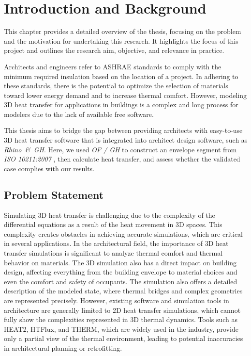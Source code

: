 \chapter{Introduction and Background}
This chapter provides a detailed overview of the thesis, focusing on the problem and the motivation for undertaking this research. It highlights the focus of this project and outlines the research aim, objective, and relevance in practice.

Architects and engineers refer to ASHRAE standards to comply with the minimum required insulation based on the location of a project. 
In adhering to these standards, there is the potential to optimize the selection of materials toward lower energy demand and to increase thermal comfort. 
However, modeling 3D heat transfer for applications in buildings is a complex and long process for modelers due to the lack of available free software. 

This thesis aims to bridge the gap between providing architects with easy-to-use 3D heat transfer software that is integrated into architect design software, such as \textit{Rhino\, \&\, \gls{GH}}. Here, we used \textit{\gls{OF} / \gls{GH}} to construct an envelope segment from \textit{ISO 10211:2007}
\cite{ISO}, then calculate heat transfer, and assess whether the validated case complies with our results. 



\section{Problem Statement}
Simulating 3D heat transfer is challenging due to the complexity of the differential equations as a result of the heat movement in 3D spaces. This complexity creates obstacles in achieving accurate simulations, which are critical in several applications. In the architectural field, the importance of 3D heat transfer simulations is significant to analyze thermal comfort and thermal behavior on materials. The 3D simulation also has a direct impact on building design, affecting everything from the building envelope to material choices and even the comfort and safety of occupants. The simulation also offers a detailed description of the modeled state, where thermal bridges and complex geometries are represented precisely.
However, existing software and simulation tools in architecture are generally limited to 2D heat transfer simulations, which cannot fully show the complexities represented in 3D thermal dynamics. Tools such as HEAT2, HTFlux, and THERM, which are widely used in the industry, provide only a partial view of the thermal environment, leading to potential inaccuracies in architectural planning or retrofitting.

